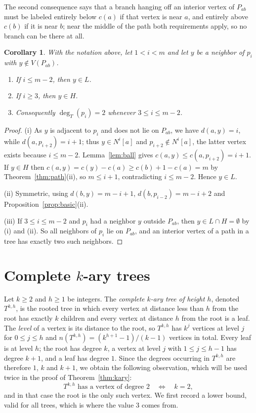 \documentclass[reqno,10pt]{article}
\newtheorem{corollary}[theorem]{Corollary}
\theoremstyle{definition}
\numberwithin{equation}{section}
\numberwithin{theorem}{section}
\newcommand{\Ball}[2]{N^{#2}[#1]}
\newcommand{\Tkh}{T^{k,h}}
\begin{document}
The second consequence says that a branch hanging off an interior vertex of
$P_{ab}$ must be labeled entirely below $c(a)$ if that vertex is near $a$, and
entirely above $c(b)$ if it is near $b$; near the middle of the path both
requirements apply, so no branch can be there at all.

\begin{corollary}
\label{cor:branch}
With the notation above, let $1<i<m$ and let $y$ be a neighbor of $p_i$ with
$y\notin V(P_{ab})$.
\begin{enumerate}
\item[\textup{(i)}] If $i\le m-2$, then $y\in L$.
\item[\textup{(ii)}] If $i\ge 3$, then $y\in H$.
\item[\textup{(iii)}] Consequently $\deg_T(p_i)=2$ whenever $3\le i\le m-2$.
\end{enumerate}
\end{corollary}

\begin{proof}
(i) As $y$ is adjacent to $p_i$ and does not lie on $P_{ab}$, we have
$d(a,y)=i$, while $d(a,p_{i+2})=i+1$; thus $y\in\Ball{a}{i}$ and
$p_{i+2}\notin\Ball{a}{i}$, the latter vertex exists because $i\le m-2$.
Lemma~\ref{lem:ball} gives $c(a,y)\le c(a,p_{i+2})=i+1$. If $y\in H$ then
$c(a,y)=c(y)-c(a)\ge c(b)+1-c(a)=m$ by Theorem~\ref{thm:path}(ii), so
$m\le i+1$, contradicting $i\le m-2$. Hence $y\in L$.

(ii) Symmetric, using $d(b,y)=m-i+1$, $d(b,p_{i-2})=m-i+2$ and
Proposition~\ref{prop:basic}(ii).

(iii) If $3\le i\le m-2$ and $p_i$ had a neighbor $y$ outside $P_{ab}$, then
$y\in L\cap H=\emptyset$ by (i) and (ii). So all neighbors of $p_i$ lie on
$P_{ab}$, and an interior vertex of a path in a tree has exactly two such
neighbors.
\end{proof}

\section{Complete \texorpdfstring{$k$}{k}-ary trees}
\label{sec:kary}

Let $k\ge2$ and $h\ge1$ be integers. The \emph{complete $k$-ary tree of height
$h$}, denoted $\Tkh$, is the rooted tree in which every vertex at distance less
than $h$ from the root has exactly $k$ children and every vertex at distance $h$
from the root is a leaf. The \emph{level} of a vertex is its distance to the
root, so $\Tkh$ has $k^{j}$ vertices at level $j$ for $0\le j\le h$ and
$n(\Tkh)=(k^{h+1}-1)/(k-1)$ vertices in total. Every leaf is at level $h$; the
root has degree $k$, a vertex at level $j$ with $1\le j\le h-1$ has degree
$k+1$, and a leaf has degree $1$. Since the degrees occurring in $\Tkh$ are
therefore $1$, $k$ and $k+1$, we obtain the following observation, which will be
used twice in the proof of Theorem~\ref{thm:kary}:
\[
  \Tkh \text{ has a vertex of degree } 2
  \quad\Longleftrightarrow\quad
  k=2 ,
\]
and in that case the root is the only such vertex.
We first record a lower bound, valid for all trees, which is where the value $3$
comes from.
\end{document}
